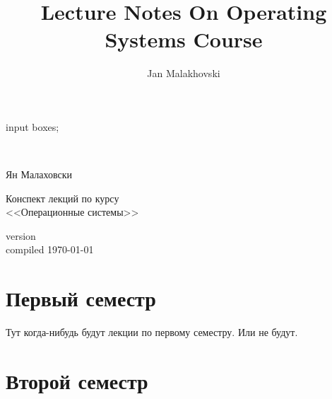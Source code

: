 \documentclass{report}
\title{Lecture Notes On Operating Systems Course}
\author{Jan Malakhovski}
\begin{document}

\begin{empfile}[figures]
\begin{empcmds}
    input boxes;
\end{empcmds}

\begin{titlepage}
    \begin{center}
        ~

        \vspace{5cm}

        {\Huge Ян Малаховски}

        \vspace{2cm}

        \vbox{\huge Конспект лекций по курсу\\ \Huge <<Операционные системы>>}

        \vfill
        
        {\large version \\ compiled \today}
    \end{center}
\end{titlepage}

\newpage
\tableofcontents

\newpage


\part{Первый семестр}
Тут когда-нибудь будут лекции по первому семестру. Или не будут.

\part{Второй семестр}


%
%
%
%

\end{empfile}
\end{document}
